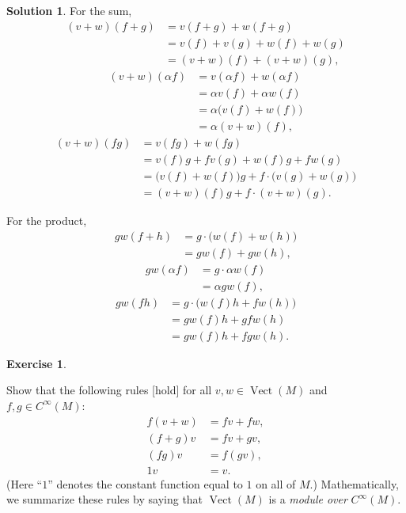 \documentclass[11pt, a4paper]{report}
\theoremstyle{definition}
\newtheorem{exercise}{Exercise}[part]
\newtheorem{solution}{Solution}[part]
\newenvironment{ex}{\begin{exercise}}{\end{exercise}\pagebreak[1]}
\newenvironment{sol}{\begin{solution}}{\end{solution}\pagebreak[3]}
\DeclareMathOperator{\Vect}{Vect}
\begin{document}
\begin{sol}

For the sum,
\begin{align*}
    (v + w)(f + g) &= v(f + g) + w(f + g) \\
                   &= v(f) + v(g) + w(f) + w(g) \\
                   &= (v + w)(f) + (v + w)(g),
\end{align*}
\begin{align*}
    (v + w)(\alpha f) &= v(\alpha f) + w(\alpha f) \\
                      &= \alpha v(f) + \alpha w(f) \\
                      &= \alpha \bigl(v(f) + w(f)\bigr) \\
                      &= \alpha (v + w)(f),
\end{align*}
\begin{align*}
    (v + w)(fg) &= v(fg) + w(fg) \\
                &= v(f)g + fv(g) + w(f)g + fw(g) \\
                &= \bigl(v(f) + w(f)\bigr)g + f \cdot \bigl(v(g) + w(g)\bigr) \\
                &= (v + w)(f)g + f \cdot (v + w)(g).
\end{align*}

For the product,
\begin{align*}
    gw(f + h) &= g \cdot \bigl(w(f) + w(h)\bigr) \\
              &= gw(f) + gw(h),
\end{align*}
\begin{align*}
    gw(\alpha f) &= g \cdot \alpha w(f) \\
        &= \alpha g w(f),
\end{align*}
\begin{align*}
    gw(fh) &= g \cdot \bigl(w(f)h + f w(h)\bigr) \\
           &= g w(f) h + g f w(h) \\
           &= gw(f) h + fgw(h).
\end{align*}

\end{sol}

\begin{ex}\label{ex:module}

Show that the following rules [hold] for all $v, w \in \Vect(M)$ and $f, g \in C^\infty(M)$:
\begin{align*}
    f(v + w) &= fv + fw, \\
    (f + g)v &= fv + gv, \\
    (fg)v &= f(gv), \\
    1v &= v.
\end{align*}
(Here ``$1$'' denotes the constant function equal to $1$ on all of $M$.) Mathematically, we summarize these rules by saying that $\Vect(M)$ is a \emph{module over} $C^\infty(M)$.

\end{ex}
\end{document}
